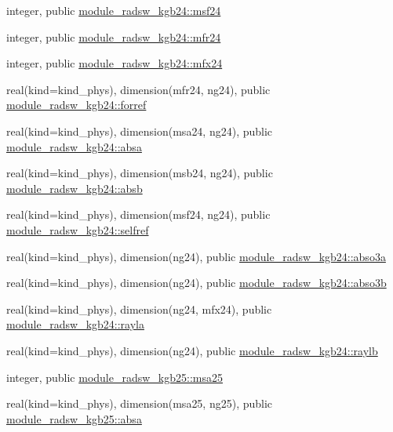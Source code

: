 \begin{DoxyCompactItemize}
\item 
integer, public \hyperlink{group__module__radsw__main_ga52d0fde0af1d5427acf0d1924f393cdc}{module\+\_\+radsw\+\_\+kgb24\+::msf24}
\item 
integer, public \hyperlink{group__module__radsw__main_ga3a1c3808493ce89f2218116a02350e51}{module\+\_\+radsw\+\_\+kgb24\+::mfr24}
\item 
integer, public \hyperlink{group__module__radsw__main_ga6fcafb0e1605ad49a252ed1e22b00a5b}{module\+\_\+radsw\+\_\+kgb24\+::mfx24}
\item 
real(kind=kind\+\_\+phys), dimension(mfr24, ng24), public \hyperlink{group__module__radsw__main_gac57357ab300edcbad8f7b3801b796af3}{module\+\_\+radsw\+\_\+kgb24\+::forref}
\item 
real(kind=kind\+\_\+phys), dimension(msa24, ng24), public \hyperlink{group__module__radsw__main_ga06965ec156c4e1d18d50a70ba43bd8e1}{module\+\_\+radsw\+\_\+kgb24\+::absa}
\item 
real(kind=kind\+\_\+phys), dimension(msb24, ng24), public \hyperlink{group__module__radsw__main_gabd4db3c9678fee17f2cfd4a3e290619a}{module\+\_\+radsw\+\_\+kgb24\+::absb}
\item 
real(kind=kind\+\_\+phys), dimension(msf24, ng24), public \hyperlink{group__module__radsw__main_ga784e78b5964fadd3e3e1f57f7af30802}{module\+\_\+radsw\+\_\+kgb24\+::selfref}
\item 
real(kind=kind\+\_\+phys), dimension(ng24), public \hyperlink{group__module__radsw__main_ga3df78e9baa46df182aad6ff9b1662dc4}{module\+\_\+radsw\+\_\+kgb24\+::abso3a}
\item 
real(kind=kind\+\_\+phys), dimension(ng24), public \hyperlink{group__module__radsw__main_ga6b44aa0637523aa1f78de5b4d16c693b}{module\+\_\+radsw\+\_\+kgb24\+::abso3b}
\item 
real(kind=kind\+\_\+phys), dimension(ng24, mfx24), public \hyperlink{group__module__radsw__main_gab24774576414b5d210c34916c3d19404}{module\+\_\+radsw\+\_\+kgb24\+::rayla}
\item 
real(kind=kind\+\_\+phys), dimension(ng24), public \hyperlink{group__module__radsw__main_ga927fc4a43727d3e0735448c1cdc60458}{module\+\_\+radsw\+\_\+kgb24\+::raylb}
\item 
integer, public \hyperlink{namespacemodule__radsw__kgb25_afc06df1f3c3a0b2f3189424ed042973e}{module\+\_\+radsw\+\_\+kgb25\+::msa25}
\item 
real(kind=kind\+\_\+phys), dimension(msa25, ng25), public \hyperlink{group__module__radsw__main_gaf4daf474954d4689219ada6d0662aceb}{module\+\_\+radsw\+\_\+kgb25\+::absa}

\end{DoxyCompactItemize}
